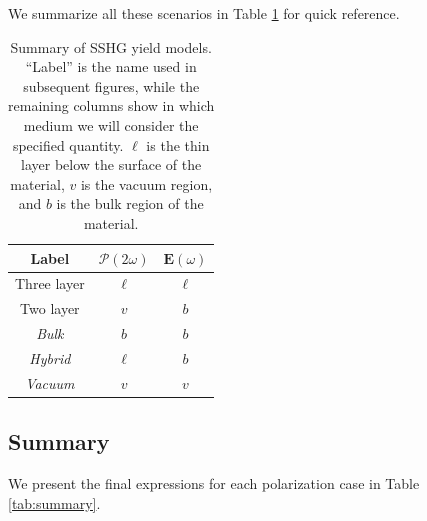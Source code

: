 We summarize all these scenarios in Table \ref{tab:models} for quick reference.

\begin{table}[t]
\begin{tabular}{| c c c |}
\hline 
Label        &  $\boldsymbol{\mathcal{P}}(2\omega)$  &  $\mathbf{E}(\omega)$ \\
\hline 
Three layer     &          $\ell$           &      $\ell$   \\
Two layer       &            $v$            &        $b$    \\
\emph{Bulk}     &            $b$            &        $b$    \\
\emph{Hybrid}   &          $\ell$           &        $b$    \\
\emph{Vacuum}   &            $v$            &        $v$    \\
\hline 
\end{tabular}
\caption{Summary of SSHG yield models. ``Label'' is the name used in subsequent 
figures, while the remaining columns show in which medium we will consider the 
specified quantity. $\ell$ is the thin layer below the surface of the material,
$v$ is the vacuum region, and $b$ is the bulk region of the 
material.\label{tab:models}}
\end{table}


\subsection{Summary}

We present the final expressions for each polarization case in Table
\ref{tab:summary}.

